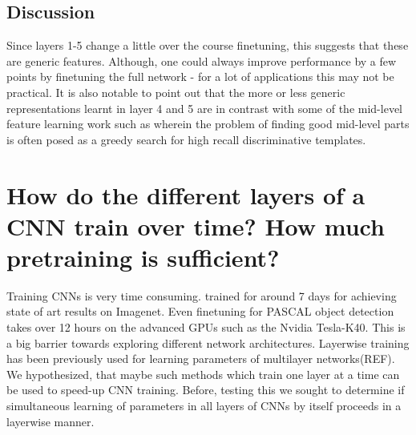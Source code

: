 \documentclass[runningheads]{llncs}
\begin{document}
\subsection{Discussion}
\label{sub:fine-discussion}
Since layers 1-5 change a little over the course finetuning, this suggests that these are generic features. Although, one could always improve performance by a few points by finetuning the full network - for a lot of applications this may not be practical. 
It is also notable to point out that the more or less generic representations learnt in layer 4 and 5 are in contrast with some of the mid-level feature learning work such as \cite{Blocks} \cite{Mid1} wherein the problem of finding good mid-level parts is often posed as a greedy search for high recall discriminative templates.

\section{How do the different layers of a CNN train over time? How much pretraining is sufficient?}
\label{sec:speed}
Training CNNs is very time consuming. \cite{Kriz} trained for around 7 days for achieving state of art results on Imagenet. Even finetuning for PASCAL object detection \cite{Rcnn} takes over 12 hours on the advanced GPUs such as the Nvidia Tesla-K40. This is a big barrier towards exploring different network architectures. Layerwise training has been previously used for learning parameters of multilayer networks(REF). We hypothesized, that maybe such methods which train one layer at a time can be used to speed-up CNN training. Before, testing this we sought to determine if simultaneous learning of parameters in all layers of CNNs by itself proceeds in a layerwise manner. 
\end{document}
